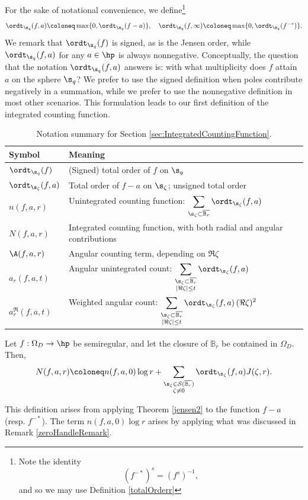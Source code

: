 \documentclass{amsart}
\begin{document}
 For the sake of notational convenience, we define\footnote{Note the identity \[(f^{-*})^s=(f^s)^{-1},\] and so we may use Definition \ref{totalOrderr}}\[\ordt_{\s_q}(f,a)\coloneq \max\{0,\ordt_{\s_q}(f-a)\}, \quad \ordt_{\s_q}(f,\infty)\coloneq \max\{0,\ordt_{\s_q}(f^{-*})\}.\] We remark that $\ordt_{\s_q}(f)$ is signed, as is the Jensen order, while $\ordt_{\s_q}(f,a)$ for any $a\in\hp$ is always nonnegative. Conceptually, the question that the notation $\ordt_{\s_q}(f,a)$ answers is: with what multiplicity does $f$ attain $a$ on the sphere $\s_q$? We prefer to use the signed definition when poles contribute negatively in a summation, while we prefer to use the nonnegative definition in most other scenarios. This formulation leads to our first definition of the integrated counting function. 

\begin{table}[ht]
\centering
\caption{Notation summary for Section \ref{sec:IntegratedCountingFunction}.}
\label{tab:counting-notation}
\begin{tabularx}{\textwidth}{@{}lX@{}}
\toprule
Symbol & Meaning \\ 
\midrule
$\ordt_{\s_q}(f)$ & (Signed) total order of $f$ on  $\s_q$ \\[2pt]
$\ordt_{\s_\zeta}(f,a)$ & Total order of $f-a$ on $\s_\zeta$; unsigned total order \\[2pt]
$n(f,a,r)$ & Unintegrated counting function: $\displaystyle \sum_{\s_\zeta\subset\overline{\mathbb B_r}}\ordt_{\s_\zeta}(f,a)$ \\[2pt]
$N(f,a,r)$ & Integrated counting function, with both radial and angular contributions \\[2pt]
$\A(f,a,r)$ & Angular counting term, depending on $\Re \zeta$ \\[2pt]
$a_r(f,a,t)$ & Angular unintegrated count: $\displaystyle \sum_{\substack{\s_\zeta\subset\overline{\mathbb B_r}\\|\Re\zeta|\le t}}\ordt_{\s_\zeta}(f,a)$ \\[2pt]
$a_r^{\Re}(f,a,t)$ & Weighted angular count: $\displaystyle \sum_{\substack{\s_\zeta\subset\overline{\mathbb B_r}\\|\Re\zeta|\le t}}\ordt_{\s_\zeta}(f,a)\,(\Re\zeta)^2$ \\
\bottomrule
\end{tabularx}
\end{table}


\begin{defin}\label{def:IntegratedCountingFunction}
      Let $f:\Omega_D\to\hp$ be semiregular, and let the closure of $\mathbb{B}_r$ be contained in $\Omega_D$. Then, \[N(f,a,r)\coloneq n(f,a,0)\log r+\sum_{\substack{ \s_\zeta\in\mathcal{S}(\overline{\mathbb B_r}) \\ \zeta\neq 0}}\ordt_{\s_\zeta}(f,a)J(\zeta,r).\]
\end{defin}
This definition arises from applying Theorem \ref{jensen2} to the function $f-a$ (resp. $f^{-*}$). The term $n(f,a,0)\log r$ arises by applying what was discussed in Remark \ref{zeroHandleRemark}. 
\end{document}
